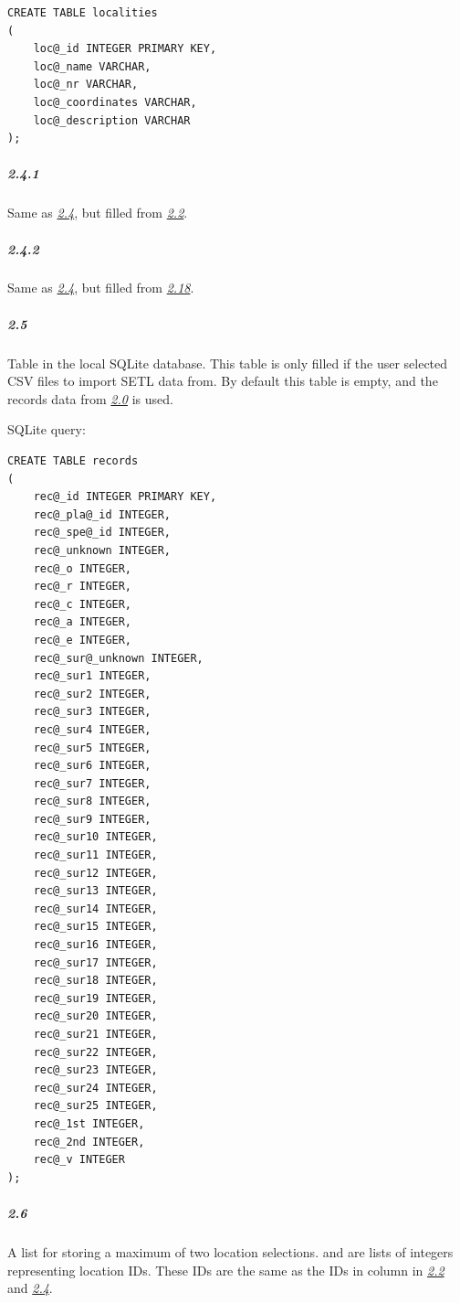 \documentclass[letterpaper,10pt,english]{sphinxmanual}
\begin{document}
\begin{Verbatim}[commandchars=@\[\]]
CREATE TABLE localities
(
    loc@_id INTEGER PRIMARY KEY,
    loc@_name VARCHAR,
    loc@_nr VARCHAR,
    loc@_coordinates VARCHAR,
    loc@_description VARCHAR
);
\end{Verbatim}


\subparagraph{2.4.1}
\label{design_parts_data:id8}\label{design_parts_data:design-part-data-2-4-1}
Same as {\hyperref[design_parts_data:design-part-data-2-4]{\emph{2.4}}}, but filled from
{\hyperref[design_parts_data:design-part-data-2-2]{\emph{2.2}}}.


\subparagraph{2.4.2}
\label{design_parts_data:design-part-data-2-4-2}\label{design_parts_data:id9}
Same as {\hyperref[design_parts_data:design-part-data-2-4]{\emph{2.4}}}, but filled from
{\hyperref[design_parts_data:design-part-data-2-18]{\emph{2.18}}}.


\subparagraph{2.5}
\label{design_parts_data:id10}\label{design_parts_data:design-part-data-2-5}
Table  in the local SQLite database. This table is only filled
if the user selected CSV files to import SETL data from. By default
this table is empty, and the records data from {\hyperref[design_parts_data:design-part-data-2-0]{\emph{2.0}}}
is used.

SQLite query:

\begin{Verbatim}[commandchars=@\[\]]
CREATE TABLE records
(
    rec@_id INTEGER PRIMARY KEY,
    rec@_pla@_id INTEGER,
    rec@_spe@_id INTEGER,
    rec@_unknown INTEGER,
    rec@_o INTEGER,
    rec@_r INTEGER,
    rec@_c INTEGER,
    rec@_a INTEGER,
    rec@_e INTEGER,
    rec@_sur@_unknown INTEGER,
    rec@_sur1 INTEGER,
    rec@_sur2 INTEGER,
    rec@_sur3 INTEGER,
    rec@_sur4 INTEGER,
    rec@_sur5 INTEGER,
    rec@_sur6 INTEGER,
    rec@_sur7 INTEGER,
    rec@_sur8 INTEGER,
    rec@_sur9 INTEGER,
    rec@_sur10 INTEGER,
    rec@_sur11 INTEGER,
    rec@_sur12 INTEGER,
    rec@_sur13 INTEGER,
    rec@_sur14 INTEGER,
    rec@_sur15 INTEGER,
    rec@_sur16 INTEGER,
    rec@_sur17 INTEGER,
    rec@_sur18 INTEGER,
    rec@_sur19 INTEGER,
    rec@_sur20 INTEGER,
    rec@_sur21 INTEGER,
    rec@_sur22 INTEGER,
    rec@_sur23 INTEGER,
    rec@_sur24 INTEGER,
    rec@_sur25 INTEGER,
    rec@_1st INTEGER,
    rec@_2nd INTEGER,
    rec@_v INTEGER
);
\end{Verbatim}


\subparagraph{2.6}
\label{design_parts_data:design-part-data-2-6}\label{design_parts_data:id11}
A list  for storing a maximum of two
location selections.  and  are lists
of integers representing location IDs. These IDs are the same as the IDs
in column  in {\hyperref[design_parts_data:design-part-data-2-2]{\emph{2.2}}} and
{\hyperref[design_parts_data:design-part-data-2-4]{\emph{2.4}}}.
\end{document}
